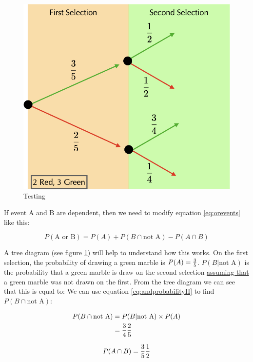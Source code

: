  \begin{figure}
   \includegraphics[scale = 0.3]{Figures/treeDiagram.png}
   \caption{Testing \label{fig:tree}}
   \end{figure}

 If event A and B are dependent, then we need to modify equation
 \eqref{eq:orevents} like this:

  \begin{equation}
   P(\text{A or B}) = P(A) + P(B\cap  \text{not A}) - P(A \cap B)\label{eq:oreventsdependent}
 \end{equation}

 A tree diagram (see figure \ref{fig:tree}) will help to understand
 how this works.  On the first selection, the probability of drawing a
 green marble is $P(A) =  {3\over 5}$.  $P(B| \text{not A})$ is the
 probability that a green marble is draw on the second selection
 \underline{assuming that} a green marble was not drawn on the first.
 From the tree diagram we can see that this is equal to:  We can use
 equation \eqref{eq:andprobabilityII} to find $P(B\cap \text{not A})$:

 \begin{align}
   P(B\cap \text{not A}) &= P(B| \text{not A}) \times P(A)\nonumber \\
                         &= {3\over 4} {2\over 5}\nonumber
 \end{align}

 \begin{equation}
   P(A \cap B) = {3\over 5}{1\over 2}\nonumber
\end{equation}


